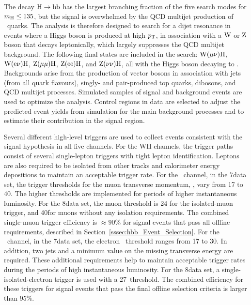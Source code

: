 \documentclass[12pt,twoside,a4paper,cmspaper,final,collab]{cms-tdr}
\begin{document}
The decay $\mathrm{H}\to\mathrm{b}\mathrm{b}$ has the
largest branching fraction of the five search modes for $m_{\mathrm{H}}\leq135$\GeV, but the
signal is overwhelmed by the QCD multijet production of \cPqb\ quarks.  The analysis
is therefore designed to search for a dijet resonance in events
where a Higgs boson is produced at high $p_{\mathrm{T}}$, in association
with a $\mathrm{W}$ or $\mathrm{Z}$ boson that decays leptonically, which largely suppresses the QCD
multijet background.
The following final states are
included in the search:
$\mathrm{W}(\mu\nu)\mathrm{H}$, $\mathrm{W}(\mathrm{e}\nu)\mathrm{H}$, $\mathrm{Z}(\mu\mu)\mathrm{H}$,
$\mathrm{Z}(\mathrm{e}\mathrm{e})\mathrm{H}$, and $\mathrm{Z}(\nu\nu)\mathrm{H}$, all with the Higgs
boson decaying to \cPqb\cPqb. Backgrounds arise from the production of vector bosons in association with
jets (from all quark flavours), singly- and pair-produced top quarks, dibosons, and
QCD multijet processes.
Simulated samples of signal and background events are used to
optimize the analysis. Control regions in data
are selected to adjust the predicted event yields from simulation for the main
background processes  and to estimate their contribution in the signal
region.




Several different high-level triggers are used to collect events consistent with
the signal hypothesis in all five channels. For the WH channels, the trigger paths consist of several single-lepton
triggers with tight lepton identification. Leptons are also required
to be isolated from other tracks and calorimeter energy depositions to maintain an acceptable trigger
rate. For the \WmnH\ channel, in the 7\TeV data set, the trigger
thresholds for the muon transverse
 momentum, \PT, vary from  17 to 40\GeV. The higher
thresholds are implemented  for periods of higher instantaneous
luminosity. For the 8\TeV  data set, the muon \PT threshold is 24\GeV
for the isolated-muon trigger, and 40\GeV for muons without any isolation requirements.
The combined single-muon trigger efficiency is $\approx$$90\%$ for
signal events that pass all offline requirements, described
in Section~\ref{sssec:hbb_Event_Selection}.
For the \WenH\ channel, in the 7\TeV data set,  the electron \PT\
threshold ranges from 17 to 30\GeV. In addition, two jets and a minimum
value on the missing transverse energy are required.
These additional requirements
help to maintain acceptable trigger
rates during the periods of high instantaneous luminosity. For the
8\TeV data set, a single-isolated-electron trigger is used with
a 27\GeV \PT\ threshold.
The combined efficiency for these triggers for signal events that
pass the final offline selection criteria is larger than 95\%.
\end{document}
